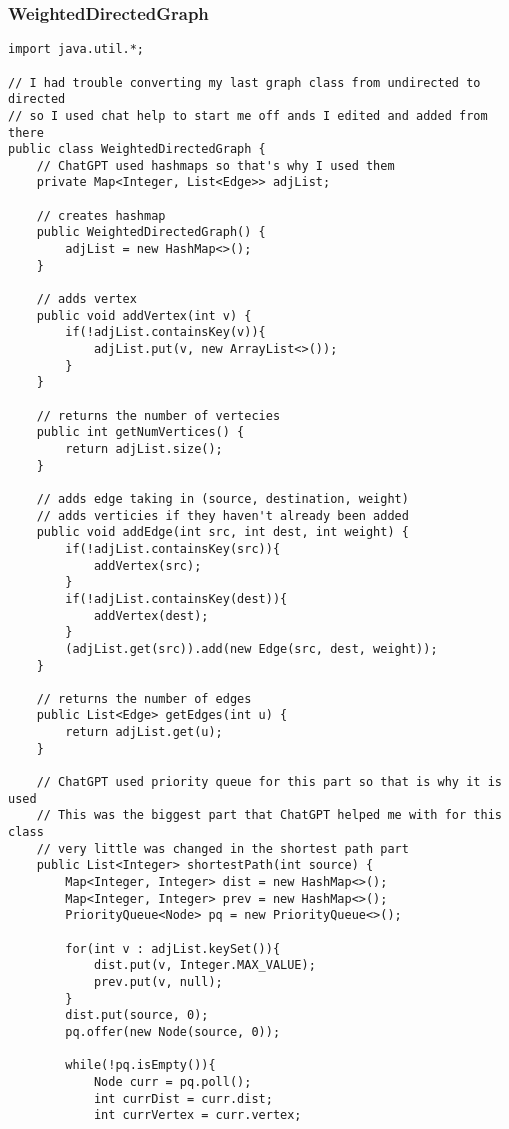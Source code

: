 \documentclass[10pt]{article}
\begin{document}
\subsubsection{WeightedDirectedGraph}
\lstset{numbers=left, numberstyle=\tiny, stepnumber=1, numbersep=5pt, basicstyle=\footnotesize\ttfamily}
\begin{lstlisting}[frame=single, ]  
import java.util.*;

// I had trouble converting my last graph class from undirected to directed
// so I used chat help to start me off ands I edited and added from there
public class WeightedDirectedGraph {
    // ChatGPT used hashmaps so that's why I used them
    private Map<Integer, List<Edge>> adjList;
    
    // creates hashmap
    public WeightedDirectedGraph() {
        adjList = new HashMap<>();
    }
    
    // adds vertex
    public void addVertex(int v) {
        if(!adjList.containsKey(v)){
            adjList.put(v, new ArrayList<>());
        }
    }

    // returns the number of vertecies
    public int getNumVertices() {
        return adjList.size();
    }
    
    // adds edge taking in (source, destination, weight)
    // adds verticies if they haven't already been added
    public void addEdge(int src, int dest, int weight) {
        if(!adjList.containsKey(src)){
            addVertex(src);
        }
        if(!adjList.containsKey(dest)){
            addVertex(dest);
        }
        (adjList.get(src)).add(new Edge(src, dest, weight));
    }

    // returns the number of edges
    public List<Edge> getEdges(int u) {
        return adjList.get(u);
    }
    
    // ChatGPT used priority queue for this part so that is why it is used
    // This was the biggest part that ChatGPT helped me with for this class
    // very little was changed in the shortest path part
    public List<Integer> shortestPath(int source) {
        Map<Integer, Integer> dist = new HashMap<>();
        Map<Integer, Integer> prev = new HashMap<>();
        PriorityQueue<Node> pq = new PriorityQueue<>();
        
        for(int v : adjList.keySet()){
            dist.put(v, Integer.MAX_VALUE);
            prev.put(v, null);
        }
        dist.put(source, 0);
        pq.offer(new Node(source, 0));
        
        while(!pq.isEmpty()){
            Node curr = pq.poll();
            int currDist = curr.dist;
            int currVertex = curr.vertex;
            

\end{lstlisting}
\end{document}
